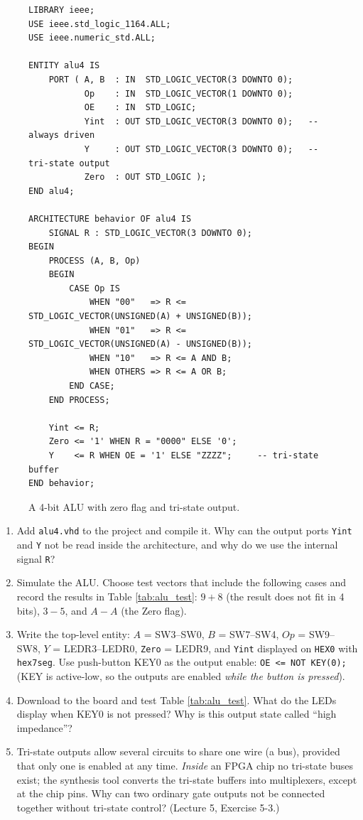 \documentclass{article}
\begin{document}
\begin{figure}[H]
    \centering
    \begin{verbatim}
LIBRARY ieee;
USE ieee.std_logic_1164.ALL;
USE ieee.numeric_std.ALL;

ENTITY alu4 IS
    PORT ( A, B  : IN  STD_LOGIC_VECTOR(3 DOWNTO 0);
           Op    : IN  STD_LOGIC_VECTOR(1 DOWNTO 0);
           OE    : IN  STD_LOGIC;
           Yint  : OUT STD_LOGIC_VECTOR(3 DOWNTO 0);   -- always driven
           Y     : OUT STD_LOGIC_VECTOR(3 DOWNTO 0);   -- tri-state output
           Zero  : OUT STD_LOGIC );
END alu4;

ARCHITECTURE behavior OF alu4 IS
    SIGNAL R : STD_LOGIC_VECTOR(3 DOWNTO 0);
BEGIN
    PROCESS (A, B, Op)
    BEGIN
        CASE Op IS
            WHEN "00"   => R <= STD_LOGIC_VECTOR(UNSIGNED(A) + UNSIGNED(B));
            WHEN "01"   => R <= STD_LOGIC_VECTOR(UNSIGNED(A) - UNSIGNED(B));
            WHEN "10"   => R <= A AND B;
            WHEN OTHERS => R <= A OR B;
        END CASE;
    END PROCESS;

    Yint <= R;
    Zero <= '1' WHEN R = "0000" ELSE '0';
    Y    <= R WHEN OE = '1' ELSE "ZZZZ";     -- tri-state buffer
END behavior;
    \end{verbatim}
    \caption{A 4-bit ALU with zero flag and tri-state output.}
    \label{fig:alu_vhdl}
\end{figure}

\begin{enumerate}
    \item Add \texttt{alu4.vhd} to the project and compile it. Why can the output ports \texttt{Yint} and \texttt{Y} not be read inside the architecture, and why do we use the internal signal \texttt{R}?
    \item Simulate the ALU. Choose test vectors that include the following cases and record the results in Table \ref{tab:alu_test}: $9+8$ (the result does not fit in 4 bits), $3-5$, and $A-A$ (the Zero flag).
    \item Write the top-level entity: $A$ = SW3--SW0, $B$ = SW7--SW4, $Op$ = SW9--SW8, $Y$ = LEDR3--LEDR0, \texttt{Zero} = LEDR9, and \texttt{Yint} displayed on \texttt{HEX0} with \texttt{hex7seg}. Use push-button KEY0 as the output enable: \texttt{OE <= NOT KEY(0);} (KEY is active-low, so the outputs are enabled \emph{while the button is pressed}).
    \item Download to the board and test Table \ref{tab:alu_test}. What do the LEDs display when KEY0 is not pressed? Why is this output state called ``high impedance''?
    \item Tri-state outputs allow several circuits to share one wire (a bus), provided that only one is enabled at any time. \emph{Inside} an FPGA chip no tri-state buses exist; the synthesis tool converts the tri-state buffers into multiplexers, except at the chip pins. Why can two ordinary gate outputs not be connected together without tri-state control? (Lecture 5, Exercise 5-3.)
\end{enumerate}
\end{document}
